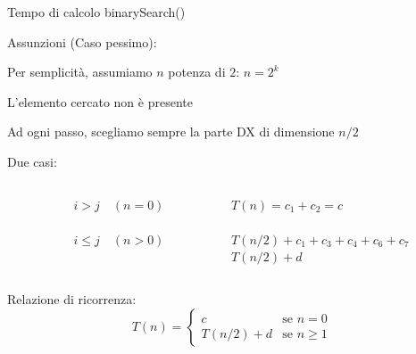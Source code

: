 \begin{frame}{Tempo di calcolo \textsf{binarySearch}()}
\BI
\item \alert{Assunzioni} (Caso pessimo):
\BI
\item Per semplicità, assumiamo $n$ potenza di $2$: $n =2^k$
\item L'elemento cercato non è presente 
\item Ad ogni passo, scegliamo sempre la parte DX di dimensione $n/2$ 
\EI
\item \alert{Due casi}:
\begin{columns}[T]
\begin{column}{0.1\textwidth}\end{column}
\begin{column}{0.3\textwidth}
$i>j \quad(n=0)$\\	
~\\
$i\leq j \quad (n>0)$
\end{column}
\begin{column}{0.6\textwidth}
$T(n) = c_1 + c_2 = c$\\
~\\
 $T(n/2) + c_1+c_3+c_4+c_6+c_7$\\
\makebox[1.2cm][r]{$=$} $T(n/2) + d$
\end{column}
\end{columns}
\item \alert{Relazione di ricorrenza}:
\[
T(n) = \begin{cases}
c  & \textrm{se $n=0$}\\
T(n/2) + d & \textrm{se $n\ge1$}
\end{cases}
\]
\EI
\end{frame}

